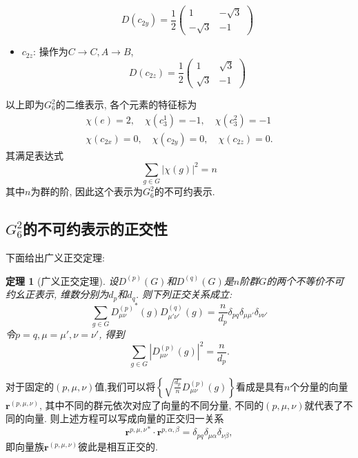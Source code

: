 \documentclass[UTF8]{ctexart}
\newtheorem{thm}{定理}
\begin{document}
\begin{itemize}
  \begin{equation}
    D(c_{2y}) = \frac{1}{2}
    \begin{pmatrix}
      1 & -\sqrt{3} \\
      -\sqrt{3} & -1
    \end{pmatrix}
  \end{equation}
\item $c_{2z}$: 操作为$C \rightarrow C, A \rightarrow B$,
  \begin{equation}
    D(c_{2z}) = \frac{1}{2}
    \begin{pmatrix}
      1 & \sqrt{3} \\
      \sqrt{3} & -1
    \end{pmatrix}
  \end{equation}
\end{itemize}

以上即为$G_6^2$的二维表示, 各个元素的特征标为
\begin{gather}
  \chi (e) = 2, \quad \chi (c_3^1) = -1, \quad \chi (c_3^2) = -1 \\
  \chi (c_{2x}) = 0, \quad \chi (c_{2y}) = 0, \quad \chi (c_{2z}) = 0.
\end{gather}
其满足表达式
\begin{equation}
  \sum_{g\in G} |\chi (g)|^2 = n
\end{equation}
其中$n$为群的阶, 因此这个表示为$G_6^2$的不可约表示.

\subsection{$G_6^2$的不可约表示的正交性}
下面给出广义正交定理:
\begin{thm}[广义正交定理]
  设$D^{(p)} (G)$和$D^{(q)} (G)$是$n$阶群$G$的两个不等价不可约幺正表示, 维数分别为$d_p$和$d_q$. 则下列正交关系成立:
  \begin{equation}
    \sum_{g\in G} {D_{\mu \nu}^{(p)}}^{*}(g) D_{\mu' \nu'}^{(q)} (g) = \frac{n}{d_p} \delta_{pq} \delta_{\mu \mu'} \delta_{\nu \nu'}
  \end{equation}
令$p = q, \mu = \mu', \nu = \nu'$, 得到
\begin{equation}
  \sum_{g\in G} |D_{\mu \nu}^{(p)} (g)|^2 = \frac{n}{d_p}.
\end{equation}
\end{thm}

对于固定的$(p,\mu,\nu)$值,我们可以将$\left\{ \sqrt{\frac{d_p}{n}} D_{\mu \nu}^{(p)} (g)\right\}$看成是具有$n$个分量的向量$\bm{r}^{(p,\mu,\nu)}$, 其中不同的群元依次对应了向量的不同分量, 不同的$(p, \mu, \nu)$就代表了不同的向量. 则上述方程可以写成向量的正交归一关系
\begin{equation}
  {\bm{r}^{p,\mu,\nu}}^{*} \cdot \bm{r}^{p,\alpha,\beta} = \delta_{pq} \delta_{\mu \alpha} \delta_{\nu \beta},
\end{equation}
即向量族$\bm{r}^{(p,\mu,\nu)}$彼此是相互正交的.
\end{document}
